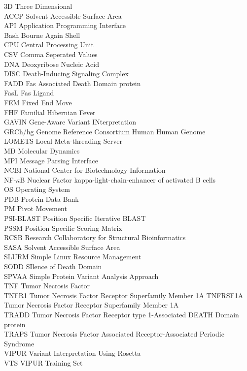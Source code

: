 3D Three Dimensional\\
ACCP Solvent Accessible Surface Area\\
API Application Programming Interface\\
Bash Bourne Again Shell\\
CPU Central Processing Unit\\
CSV Comma Seperated Values\\
DNA Deoxyribose Nucleic Acid\\
DISC Death-Inducing Signaling Complex\\
FADD Fas Associated Death Domain protein\\
FasL Fas Ligand\\
FEM Fixed End Move\\
FHF Familial Hibernian Fever\\
GAVIN Gene-Aware Variant INterpretation\\
GRCh/hg Genome Reference Consortium Human Human Genome\\
LOMETS Local Meta-threading Server\\
MD	Molecular Dynamics\\
MPI Message Parsing Interface\\
NCBI National Center for Biotechnology Information\\
NF-$\kappa$B Nuclear Factor kappa-light-chain-enhancer of activated B cells\\
OS Operating System\\
PDB Protein Data Bank\\
PM Pivot Movement\\
PSI-BLAST Position Specific Iterative BLAST\\
PSSM Position Specific Scoring Matrix\\
RCSB Research Collaboratory for Structural Bioinformatics\\
SASA Solvent Accessible Surface Area\\
SLURM Simple Linux Resource Management\\
SODD SIlence of Death Domain\\
SPVAA Simple Protein Variant Analysis Approach\\
TNF Tumor Necrosis Factor\\
TNFR1 Tumor Necrosis Factor Receptor Superfamily Member 1A
TNFRSF1A Tumor Necrosis Factor Receptor Superfamily Member 1A\\
TRADD Tumor Necrosis Factor Receptor type 1-Associated DEATH Domain protein\\
TRAPS Tumor Necrosis Factor Associated Receptor-Associated Periodic Syndrome\\
VIPUR Variant Interpretation Using Rosetta\\
VTS VIPUR Training Set\\